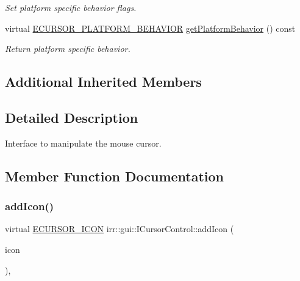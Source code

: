 \begin{DoxyCompactItemize}
\begin{DoxyCompactList}\small\item\em Set platform specific behavior flags. \end{DoxyCompactList}\item 
virtual \hyperlink{namespaceirr_1_1gui_abbd186f9cfba2f805d98248df226acef}{E\+C\+U\+R\+S\+O\+R\+\_\+\+P\+L\+A\+T\+F\+O\+R\+M\+\_\+\+B\+E\+H\+A\+V\+I\+OR} \hyperlink{classirr_1_1gui_1_1ICursorControl_aad19b5b02de0b8bc476c66b152b745c4}{get\+Platform\+Behavior} () const
\begin{DoxyCompactList}\small\item\em Return platform specific behavior. \end{DoxyCompactList}\end{DoxyCompactItemize}
\subsection*{Additional Inherited Members}


\subsection{Detailed Description}
Interface to manipulate the mouse cursor. 

\subsection{Member Function Documentation}
\mbox{\label{classirr_1_1gui_1_1ICursorControl_a102ff455c70595886281e636ef063d3b}} 
\subsubsection{\texorpdfstring{add\+Icon()}{addIcon()}\hspace{0.1cm}{\footnotesize\ttfamily [1/2]}}
{\footnotesize\ttfamily virtual \hyperlink{namespaceirr_1_1gui_aefee802dd632c5735703e40ef40f879b}{E\+C\+U\+R\+S\+O\+R\+\_\+\+I\+C\+ON} irr\+::gui\+::\+I\+Cursor\+Control\+::add\+Icon (\begin{DoxyParamCaption}\item[{const \hyperlink{structirr_1_1gui_1_1SCursorSprite}{gui\+::\+S\+Cursor\+Sprite} \&}]{icon }\end{DoxyParamCaption})\hspace{0.3cm}{\ttfamily [inline]}, {\ttfamily [virtual]}}




